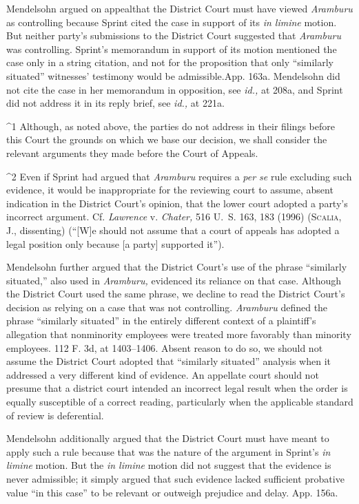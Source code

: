   Mendelsohn argued on appeal\footnotemark[1] that the District Court must
have viewed \emph{Aramburu} as controlling because Sprint cited the
case in support of its \emph{in limine} motion. But neither party's
submissions to the District Court suggested that \emph{Aramburu} was
controlling. Sprint's memorandum in support of its motion mentioned
the case only in a string citation, and not for the proposition
that only ``similarly situated'' witnesses' testimony would be
admissible.\footnotemark[2] App. 163a. Mendelsohn did not cite the case in her
memorandum in opposition, see \emph{id.,} at 208a, and Sprint did not
address it in its reply brief, see \emph{id.,} at 221a. \newpage 

^1 Although, as noted above, the parties do not address in their filings
before this Court the grounds on which we base our decision, we shall
consider the relevant arguments they made before the Court of Appeals.

^2 Even if Sprint had argued that \emph{Aramburu} requires a \emph{per
se} rule excluding such evidence, it would be inappropriate for
the reviewing court to assume, absent indication in the District
Court's opinion, that the lower court adopted a party's incorrect
argument. Cf. \emph{Lawrence} v. \emph{Chater,} 516 U.~S. 163, 183 (1996)
(\textsc{Scalia,} J., dissenting) (``[W]e should not assume that a court of
appeals has adopted a legal position only because [a party] supported
it'').

  Mendelsohn further argued that the District Court's use of the
phrase ``similarly situated,'' also used in \emph{Aramburu,} evidenced
its reliance on that case. Although the District Court used the same
phrase, we decline to read the District Court's decision as relying
on a case that was not controlling. \emph{Aramburu} defined the phrase
``similarly situated'' in the entirely different context of a
plaintiff's allegation that nonminority employees were treated more
favorably than minority employees. 112 F. 3d, at 1403--1406. Absent
reason to do so, we should not assume the District Court adopted that
``similarly situated'' analysis when it addressed a very different
kind of evidence. An appellate court should not presume that a district
court intended an incorrect legal result when the order is equally
susceptible of a correct reading, particularly when the applicable
standard of review is deferential.

  Mendelsohn additionally argued that the District Court must have meant
to apply such a rule because that was the nature of the argument in
Sprint's \emph{in limine} motion. But the \emph{in limine} motion did not
suggest that the evidence is never admissible; it simply argued that
such evidence lacked sufficient probative value ``in this case'' to be
relevant or outweigh prejudice and delay. App. 156a.

